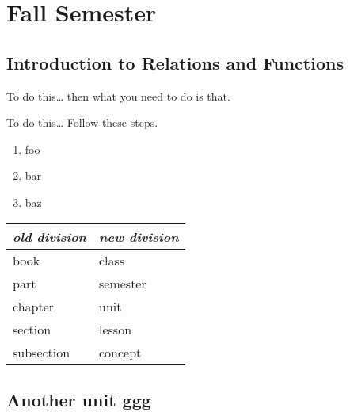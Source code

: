 \documentclass[letterpaper]{memoir}
\begin{document}
\part{Fall Semester}
\chapter{Introduction to Relations and Functions}
\chapterprecis{\blindtext}


\begin{myObjectives}
\end{myObjectives}

\begin{myVocabulary}
\end{myVocabulary}

\begin{myConcept}{To do this\dots}
    then what you need to do is that.
\end{myConcept}
\begin{myConcept}{To do this\dots}
    Follow these steps.
    \begin{enumerate}
        \item foo
        \item bar
        \item baz
    \end{enumerate}
\end{myConcept}


\vspace{2em}
\begin{tabular}{ll}
    \toprule
    {\bfseries\itshape old division} & {\bfseries\itshape new division} \\
    \midrule
    book & class \\
    part & semester \\
    chapter & unit \\
    section & lesson \\
    subsection & concept \\
    \bottomrule
\end{tabular}
\vspace{2em}


\chapter{Another unit ggg}

\blindtext
\end{document}
